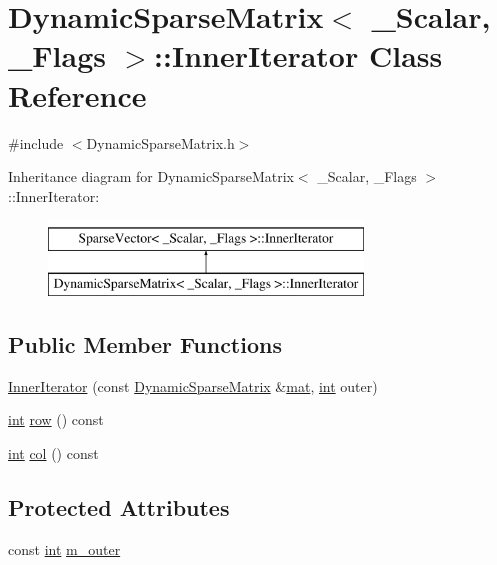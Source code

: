 \hypertarget{class_dynamic_sparse_matrix_1_1_inner_iterator}{\section{Dynamic\-Sparse\-Matrix$<$ \-\_\-\-Scalar, \-\_\-\-Flags $>$\-:\-:Inner\-Iterator Class Reference}
\label{class_dynamic_sparse_matrix_1_1_inner_iterator}
}


{\ttfamily \#include $<$Dynamic\-Sparse\-Matrix.\-h$>$}

Inheritance diagram for Dynamic\-Sparse\-Matrix$<$ \-\_\-\-Scalar, \-\_\-\-Flags $>$\-:\-:Inner\-Iterator\-:\begin{figure}[H]
\begin{center}
\leavevmode
\includegraphics[height=2.000000cm]{class_dynamic_sparse_matrix_1_1_inner_iterator}
\end{center}
\end{figure}
\subsection*{Public Member Functions}
\begin{DoxyCompactItemize}
\item 
\hyperlink{class_dynamic_sparse_matrix_1_1_inner_iterator_a8afd3930571b086fdd76a187a9862661}{Inner\-Iterator} (const \hyperlink{class_dynamic_sparse_matrix}{Dynamic\-Sparse\-Matrix} \&\hyperlink{uavobjecttemplate_8m_a16a51e808b16c46bbfd36da2e37cd123}{mat}, \hyperlink{ioapi_8h_a787fa3cf048117ba7123753c1e74fcd6}{int} outer)
\item 
\hyperlink{ioapi_8h_a787fa3cf048117ba7123753c1e74fcd6}{int} \hyperlink{class_dynamic_sparse_matrix_1_1_inner_iterator_aa37ca2f5a0714aa5b9badea9c4413d68}{row} () const 
\item 
\hyperlink{ioapi_8h_a787fa3cf048117ba7123753c1e74fcd6}{int} \hyperlink{class_dynamic_sparse_matrix_1_1_inner_iterator_a37e8c5cf2b92043d4de1b3551a9d4262}{col} () const 
\end{DoxyCompactItemize}
\subsection*{Protected Attributes}
\begin{DoxyCompactItemize}
\item 
const \hyperlink{ioapi_8h_a787fa3cf048117ba7123753c1e74fcd6}{int} \hyperlink{class_dynamic_sparse_matrix_1_1_inner_iterator_a3da12fec5adb39892595db0e17bbe705}{m\-\_\-outer}
\end{DoxyCompactItemize}



